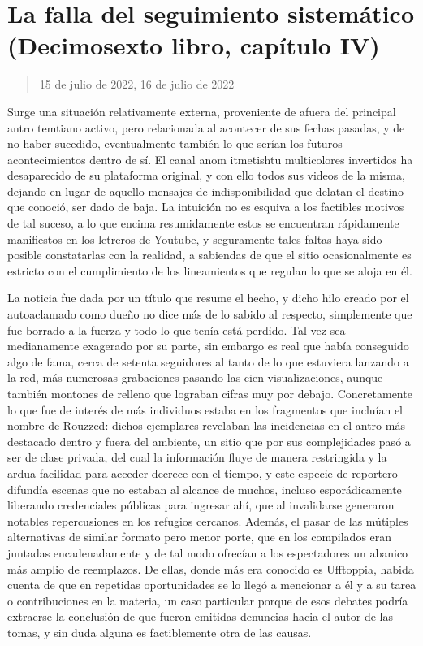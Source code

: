 \documentclass[
]{book}
\begin{document}
\hypertarget{la-falla-del-seguimiento-sistemuxe1tico-decimosexto-libro-capuxedtulo-iv}{%
\section{La falla del seguimiento sistemático (Decimosexto libro, capítulo IV)}\label{la-falla-del-seguimiento-sistemuxe1tico-decimosexto-libro-capuxedtulo-iv}}

\begin{quote}
15 de julio de 2022, 16 de julio de 2022
\end{quote}

Surge una situación relativamente externa, proveniente de afuera del principal antro temtiano activo, pero relacionada al acontecer de sus fechas pasadas, y de no haber sucedido, eventualmente también lo que serían los futuros acontecimientos dentro de sí. El canal anom itmetishtu multicolores invertidos ha desaparecido de su plataforma original, y con ello todos sus videos de la misma, dejando en lugar de aquello mensajes de indisponibilidad que delatan el destino que conoció, ser dado de baja. La intuición no es esquiva a los factibles motivos de tal suceso, a lo que encima resumidamente estos se encuentran rápidamente manifiestos en los letreros de Youtube, y seguramente tales faltas haya sido posible constatarlas con la realidad, a sabiendas de que el sitio ocasionalmente es estricto con el cumplimiento de los lineamientos que regulan lo que se aloja en él.

La noticia fue dada por un título que resume el hecho, y dicho hilo creado por el autoaclamado como dueño no dice más de lo sabido al respecto, simplemente que fue borrado a la fuerza y todo lo que tenía está perdido. Tal vez sea medianamente exagerado por su parte, sin embargo es real que había conseguido algo de fama, cerca de setenta seguidores al tanto de lo que estuviera lanzando a la red, más numerosas grabaciones pasando las cien visualizaciones, aunque también montones de relleno que lograban cifras muy por debajo. Concretamente lo que fue de interés de más individuos estaba en los fragmentos que incluían el nombre de Rouzzed: dichos ejemplares revelaban las incidencias en el antro más destacado dentro y fuera del ambiente, un sitio que por sus complejidades pasó a ser de clase privada, del cual la información fluye de manera restringida y la ardua facilidad para acceder decrece con el tiempo, y este especie de reportero difundía escenas que no estaban al alcance de muchos, incluso esporádicamente liberando credenciales públicas para ingresar ahí, que al invalidarse generaron notables repercusiones en los refugios cercanos. Además, el pasar de las mútiples alternativas de similar formato pero menor porte, que en los compilados eran juntadas encadenadamente y de tal modo ofrecían a los espectadores un abanico más amplio de reemplazos. De ellas, donde más era conocido es Ufftoppia, habida cuenta de que en repetidas oportunidades se lo llegó a mencionar a él y a su tarea o contribuciones en la materia, un caso particular porque de esos debates podría extraerse la conclusión de que fueron emitidas denuncias hacia el autor de las tomas, y sin duda alguna es factiblemente otra de las causas.
\end{document}
